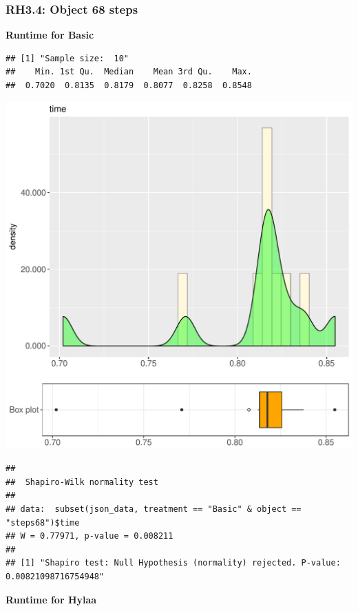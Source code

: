 \documentclass{article}\usepackage[]{graphicx}\usepackage[]{color}
\makeatletter
\def\maxwidth{ %
  \ifdim\Gin@nat@width>\linewidth
    \linewidth
  \else
    \Gin@nat@width
  \fi
}
\newenvironment{kframe}{%
 \def\at@end@of@kframe{}%
 \ifinner\ifhmode%
  \def\at@end@of@kframe{\end{minipage}}%
  \begin{minipage}{\columnwidth}%
 \fi\fi%
 \def\FrameCommand##1{\hskip\@totalleftmargin \hskip-\fboxsep
 \colorbox{shadecolor}{##1}\hskip-\fboxsep
     \hskip-\linewidth \hskip-\@totalleftmargin \hskip\columnwidth}%
 \MakeFramed {\advance\hsize-\width
   \@totalleftmargin\z@ \linewidth\hsize
   \@setminipage}}%
 {\par\unskip\endMakeFramed%
 \at@end@of@kframe}
\newenvironment{knitrout}{}{} %
\makeatother
\begin{document}
\subsubsection{RH3.4: Object 68 steps}

 \textbf{Runtime for Basic}
\begin{knitrout}
\color{fgcolor}\begin{kframe}
\begin{verbatim}
## [1] "Sample size:  10"
##    Min. 1st Qu.  Median    Mean 3rd Qu.    Max. 
##  0.7020  0.8135  0.8179  0.8077  0.8258  0.8548
\end{verbatim}
\end{kframe}
\includegraphics[width=\maxwidth]{figure/RH3_Basic_steps68-1} 
\begin{kframe}\begin{verbatim}
## 
## 	Shapiro-Wilk normality test
## 
## data:  subset(json_data, treatment == "Basic" & object == "steps68")$time
## W = 0.77971, p-value = 0.008211
## 
## [1] "Shapiro test: Null Hypothesis (normality) rejected. P-value: 0.00821098716754948"
\end{verbatim}
\end{kframe}
\end{knitrout}
 \textbf{Runtime for Hylaa}
\end{document}
